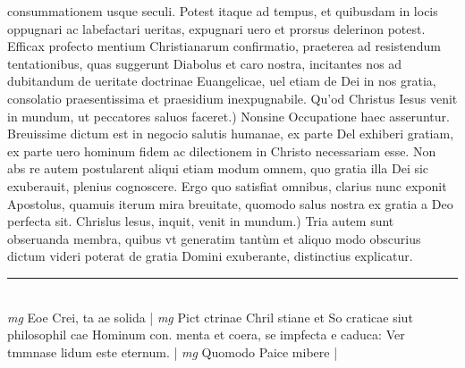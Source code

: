 \documentclass{article}
\begin{document}
\begin{pages}
consummationem usque seculi. Potest itaque ad tempus, et quibusdam in locis oppugnari ac labefactari ueritas, expugnari uero et prorsus delerinon potest. Efficax profecto mentium Christianarum confirmatio, praeterea ad resistendum tentationibus, quas suggerunt Diabolus et caro nostra, incitantes nos ad dubitandum de ueritate doctrinae Euangelicae, uel etiam de Dei in nos gratia, consolatio praesentissima et praesidium inexpugnabile.  \pend\pstart Qu'od Christus Iesus venit in mundum, ut peccatores saluos faceret.) Nonsine Occupatione haec asseruntur. Breuissime dictum est in negocio salutis humanae, ex parte Del exhiberi gratiam, ex parte uero hominum fidem ac dilectionem in Christo necessariam esse. Non abs re autem postularent aliqui etiam modum omnem, quo gratia illa Dei sic exuberauit, plenius cognoscere. Ergo quo satisfiat omnibus, clarius nunc exponit Apostolus, quamuis iterum mira breuitate, quomodo salus nostra ex gratia a Deo perfecta sit.  \pend\pstart Chrislus lesus, inquit, venit in mundum.) Tria autem sunt obseruanda membra, quibus vt generatim tantùm et aliquo modo obscurius dictum videri poterat de gratia Domini exuberante, distinctius explicatur.  \pend
\vspace{0.5cm}\noindent
\vspace{0.2cm}\rule{1cm}{0.2pt}\\ 
\hspace{0.2cm}\textit{mg}
\footnotesize Eoe Crei, ta ae solida 
\normalsize| 
\hspace{0.2cm}\textit{mg}
\footnotesize Pict ctrinae Chril stiane et So craticae siut philosophil cae Hominum con. menta et coera, se impfecta e caduca: Ver tmmnase lidum este eternum. 
\normalsize| 
\hspace{0.2cm}\textit{mg}
\footnotesize Quomodo Paice mibere 
\normalsize| 

\end{pages}
\end{document}
